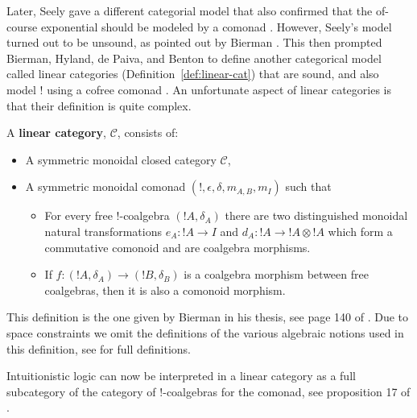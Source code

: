 Later, Seely gave a different categorial model that also confirmed
that the of-course exponential should be modeled by a comonad
\cite{Seely:1989}.  However, Seely's model turned out to be unsound,
as pointed out by Bierman \cite{Bierman:1994}.  This then prompted
Bierman, Hyland, de Paiva, and Benton to define another categorical
model called linear categories (Definition~\ref{def:linear-cat}) that
are sound, and also model $!$ using a cofree comonad
\cite{Bierman:1994}.  An unfortunate aspect of linear categories is
that their definition is quite complex.
\begin{definition}
  \label{def:linear-cat}
  A \textbf{linear category}, $\mathcal{C}$, consists of:
  \begin{center}
    \begin{itemize}
    \item A symmetric monoidal closed category $\mathcal{C}$,
    \item A symmetric monoidal comonad $(!, \epsilon, \delta, m_{A,B},
      m_I)$ such that 
      \begin{itemize}
      \item For every free $!$-coalgebra $(!A,\delta_A)$ there are two
        distinguished monoidal natural transformations $e_A : !A \to
        I$ and $d_A : !A \to !A \otimes !A$ which form a commutative
        comonoid and are coalgebra morphisms.
      \item If $f : (!A,\delta_A) \to (!B,\delta_B)$ is a coalgebra
        morphism between free coalgebras, then it is also a comonoid
        morphism.
      \end{itemize}
    \end{itemize}
  \end{center}
  This definition is the one given by Bierman in his thesis, see page
  140 of \cite{Bierman:1994}. Due to space constraints we omit the
  definitions of the various algebraic notions used in this
  definition, see \cite{Bierman:1994} for full definitions.
\end{definition}
\noindent
Intuitionistic logic can now be interpreted in a linear category as a
full subcategory of the category of $!$-coalgebras for the comonad,
see proposition 17 of \cite{Bierman:1994}.

